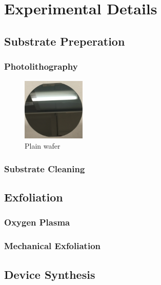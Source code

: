 \chapter{Experimental Details}\label{chap:exp_details}

\section{Substrate Preperation}\label{sec:sample_prep}
\subsection{Photolithography}\label{subsec:photolithography}
\begin{figure}[ht]
	\centering
	\includegraphics[height=3cm,width=3cm]{figs/experimental/plain_wafer}
	\caption[Plain wafer]{Plain wafer}
	\label{fig:plain_wafer}
\end{figure}
\subsection{Substrate Cleaning}\label{subsec:cleaning}

\section{Exfoliation}\label{sec:exfoliation}
\subsection{Oxygen Plasma}\label{subsec:o2plasma}
\subsection{Mechanical Exfoliation}\label{subsec:mech_exfoliation}

\section{Device Synthesis}\label{sec:synthesis}

